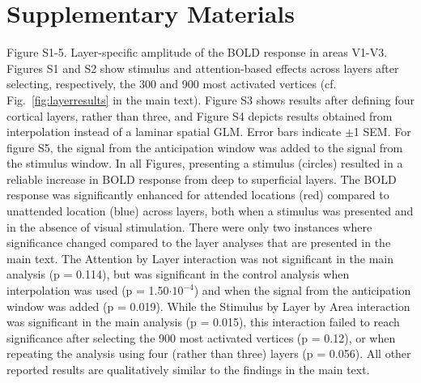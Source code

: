 \section{Supplementary Materials}
\setcounter{figure}{0}





Figure S1-5. Layer-specific amplitude of the BOLD response in areas V1-V3. Figures S1 and S2 show stimulus and attention-based effects across layers after selecting, respectively, the 300 and 900 most activated vertices (cf. Fig.~\ref{fig:layerresults} in the main text). Figure S3 shows results after defining four cortical layers, rather than three, and Figure S4 depicts results obtained from interpolation instead of a laminar spatial GLM. Error bars indicate $\pm$1 SEM. For figure S5, the signal from the anticipation window was added to the signal from the stimulus window. In all Figures, presenting a stimulus (circles) resulted in a reliable increase in BOLD response from deep to superficial layers. The BOLD response was significantly enhanced for attended locations (red) compared to unattended location (blue) across layers, both when a stimulus was presented and in the absence of visual stimulation. There were only two instances where significance changed compared to the layer analyses that are presented in the main text. The Attention by Layer interaction was not significant in the main analysis (p = 0.114), but was significant in the control analysis when interpolation was used (p = 1.50$\cdot10^{-4}$) and when the signal from the anticipation window was added (p = 0.019). While the Stimulus by Layer by Area interaction was significant in the main analysis (p = 0.015), this interaction failed to reach significance after selecting the 900 most activated vertices (p = 0.12), or when repeating the analysis using four (rather than three) layers (p = 0.056). All other reported results are qualitatively similar to the findings in the main text.
\label{SM5}


